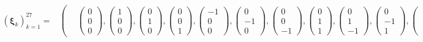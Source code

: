 \begin{equation}\label{eq:velocities}
	\begin{aligned}
		\left(\boldsymbol{\xi}_k\right)_{k=1}^{27} = &
		\left(
		\begin{aligned}
			&\left(
			\begin{aligned}
				0 \\ 0 \\ 0
			\end{aligned}
			\right),
			\left(
			\begin{aligned}
				1 \\ 0 \\ 0
			\end{aligned}
			\right),
			\left(
			\begin{aligned}
				0 \\ 1 \\ 0
			\end{aligned}
			\right),
			\left(
			\begin{aligned}
				0 \\ 0 \\ 1
			\end{aligned}
			\right),
			\left(
			\begin{aligned}
				-1 \\ 0 \\ 0
			\end{aligned}
			\right),
			\left(
			\begin{aligned}
				0 \\ -1 \\ 0
			\end{aligned}
			\right),
			\left(
			\begin{aligned}
				0 \\ 0 \\ -1
			\end{aligned}
			\right),
			\left(
			\begin{aligned}
				0 \\ 1 \\ 1
			\end{aligned}
			\right),
			\left(
			\begin{aligned}
				0 \\ 1 \\ -1
			\end{aligned}
			\right),
			\left(
			\begin{aligned}
				0 \\ -1 \\ 1
			\end{aligned}
			\right),
			\left(

\end{aligned}
\end{aligned}
\end{equation}
